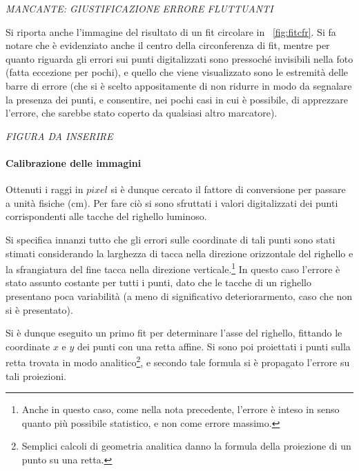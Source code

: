 \documentclass[10pt,a4paper]{article}
\begin{document}
\emph{MANCANTE: GIUSTIFICAZIONE ERRORE FLUTTUANTI}

Si riporta anche l'immagine del risultato di un fit circolare in \figurename{~\ref{fig:fitcfr}}. Si fa notare che è evidenziato anche il centro della circonferenza di fit, mentre per quanto riguarda gli errori sui punti digitalizzati sono pressoché invisibili nella foto (fatta eccezione per pochi), e quello che viene visualizzato sono le estremità delle barre di errore (che si è scelto appositamente di non ridurre in modo da segnalare la presenza dei punti, e consentire, nei pochi casi in cui è possibile, di apprezzare l'errore, che sarebbe stato coperto da qualsiasi altro marcatore).

\emph{FIGURA DA INSERIRE}

\paragraph{Calibrazione delle immagini} Ottenuti i raggi in $pixel$ si è dunque cercato il fattore di conversione per passare a unità fisiche (cm). Per fare ciò si sono sfruttati i valori digitalizzati dei punti corrispondenti alle tacche del righello luminoso.

Si specifica innanzi tutto che gli errori sulle coordinate di tali punti sono stati stimati considerando la larghezza di tacca nella direzione orizzontale del righello e la sfrangiatura del fine tacca nella direzione verticale.\footnote{Anche in questo caso, come nella nota precedente, l'errore è inteso in senso quanto più possibile statistico, e non come errore massimo.}
In questo caso l'errore è stato assunto costante per tutti i punti, dato che le tacche di un righello presentano poca variabilità (a meno di significativo deteriorarmento, caso che non si è presentato).

Si è dunque eseguito un primo fit per determinare l'asse del righello, fittando le coordinate $x$ e $y$ dei punti con una retta affine.
Si sono poi proiettati i punti sulla retta trovata in modo analitico\footnote{Semplici calcoli di geometria analitica danno la formula della proiezione di un punto su una retta.}, e secondo tale formula si è propagato l'errore su tali proiezioni.
\end{document}
